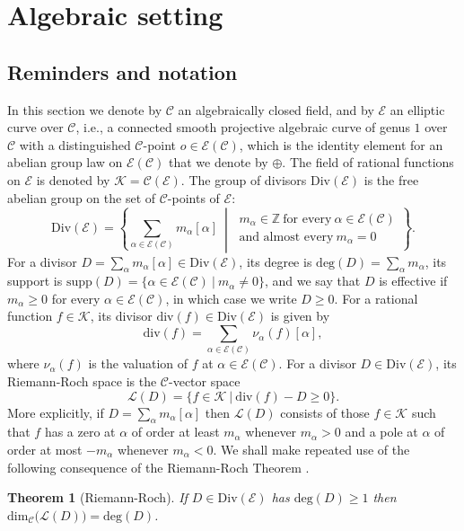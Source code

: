 \documentclass[preprint,12pt]{elsarticle}
\numberwithin{equation}{section} %
\theoremstyle{theorem}
\newtheorem{theorem}{Theorem}[section]
\theoremstyle{definition}
\newcommand{\Ca}{\mathcal{C}} %
\newcommand{\bk}{\mathcal{K}} %
\newcommand{\ec}{\mathcal{E}} %
\newcommand{\idec}{{o}} %
\newcommand{\Z}{\mathbb{Z}} %
\begin{document}
\section{Algebraic setting}\label{sec:algebraic}

\subsection{Reminders and notation}

In this section we denote by $\Ca$ an algebraically closed field, and by $\ec$ an elliptic curve over $\Ca$, i.e., a connected smooth projective algebraic curve of genus $1$ over $\Ca$ with a distinguished $\Ca$-point $\idec\in\ec(\Ca)$, which is the identity element for an abelian group law on $\ec(\Ca)$ that we denote by $\oplus$. The field of rational functions on $\ec$ is denoted by $\bk=\Ca(\ec)$. The group of divisors $\mathrm{Div}(\ec)$ is the free abelian group on the set of $\Ca$-points of $\ec$: \begin{equation}\label{eq:divisor-def}\mathrm{Div}(\ec)=\left\{\sum_{\alpha\in\ec(\Ca)}m_\alpha[\alpha] \ \middle| \ \begin{gathered} m_\alpha\in\Z \ \text{for every} \ \alpha\in\ec(\Ca) \\ \text{and almost every}\ m_\alpha=0\end{gathered}\right\}. \end{equation} For a divisor $D=\sum_\alpha m_\alpha[\alpha]\in\mathrm{Div}(\ec)$, its degree is $\mathrm{deg}(D)=\sum_\alpha m_\alpha$, its support is $\mathrm{supp}(D)=\{\alpha\in\ec(\Ca) \ | \ m_\alpha\neq 0\}$, 
and we say that $D$ is effective if $m_\alpha\geq 0$ for every $\alpha\in\ec(\Ca)$, in which case we write $D\geq 0$. For a rational function $f\in\bk$, its divisor $\mathrm{div}(f)\in\mathrm{Div}(\ec)$ is given by \[\mathrm{div}(f)=\sum_{\alpha\in\ec(\Ca)}\nu_\alpha(f)[\alpha],\] where $\nu_\alpha(f)$ is the valuation of $f$ at $\alpha\in\ec(\Ca)$. For a divisor $D\in\mathrm{Div}(\ec)$, its Riemann-Roch space is the $\Ca$-vector space \[\mathcal{L}(D)=\{f\in\bk \ | \ \mathrm{div}(f)-D\geq 0\}.\] More explicitly, if $D=\sum_\alpha m_\alpha[\alpha]$ then $\mathcal{L}(D)$ consists of those $f\in\bk$ such that $f$ has a zero at $\alpha$ of order at least $m_\alpha$ whenever $m_\alpha>0$ and a pole at $\alpha$ of order at most $-m_\alpha$ whenever $m_\alpha<0$. We shall make repeated use of the following consequence of the Riemann-Roch Theorem \cite[Cor.~II.5.5(c)]{SilvermanIntro}.
\begin{theorem}[Riemann-Roch] \label{thm:rr}
    If $D\in\mathrm{Div}(\ec)$ has $\mathrm{deg}(D)\geq 1$ then $\mathrm{dim}_\Ca\bigl(\mathcal{L}(D)\bigr)=\mathrm{deg}(D)$.
\end{theorem}
\end{document}

